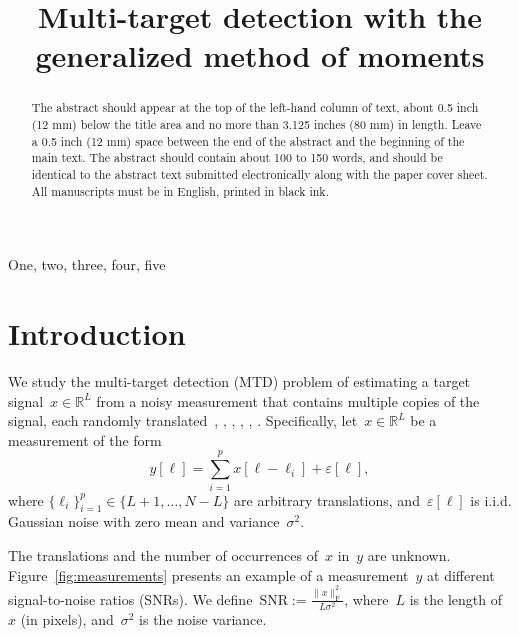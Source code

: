 \documentclass{article}
\title{Multi-target detection with the generalized method of moments}
\newcommand{\R}[0]{\mathbb{R}}
\begin{document}
%
\maketitle
%
\begin{abstract}
The abstract should appear at the top of the left-hand column of text, about
0.5 inch (12 mm) below the title area and no more than 3.125 inches (80 mm) in
length.  Leave a 0.5 inch (12 mm) space between the end of the abstract and the
beginning of the main text.  The abstract should contain about 100 to 150
words, and should be identical to the abstract text submitted electronically
along with the paper cover sheet.  All manuscripts must be in English, printed
in black ink.
\end{abstract}
%
\begin{keywords}
One, two, three, four, five
\end{keywords}
%
\section{Introduction}
\label{sec:intro}

We study the multi-target detection (MTD) problem of estimating a target signal~$x\in\R^L$ from a noisy measurement that contains multiple copies of the signal, each randomly translated~\cite{bendory2019multi}, \cite{lan2020multi}, \cite{marshall2020image}, \cite{bendory2021multi}, \cite{kreymer2021two}, \cite{bendory2018toward}. Specifically, let~$x\in\R^L$ be a measurement of the form
\begin{equation}
\label{eq:model}
y[\ell] = \sum_{i=1}^{p} x[\ell - \ell_i] + \varepsilon[\ell],
\end{equation}
where \mbox{$\{\ell_i\}_{i=1}^{p} \in \{L + 1, \ldots, N-L\}$} are arbitrary translations, and~$\varepsilon[\ell]$ is i.i.d. Gaussian noise with zero mean and \mbox{variance~$\sigma^2$}.

The translations and the number of occurrences of~$x$ in~$y$ are unknown. Figure~\ref{fig:measurements} presents an example of a measurement~$y$ at different signal-to-noise ratios (SNRs). We define~\mbox{$\text{SNR} := \frac{\|x\|_\text{F}^2}{L \sigma^2}$}, where~$L$ is the length of~$x$ (in pixels), and~$\sigma^2$ is the noise variance.
\end{document}
